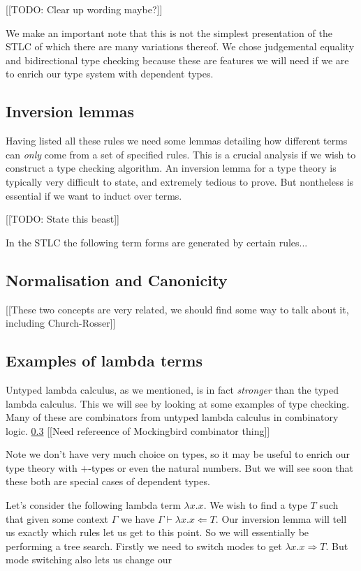 [[TODO: Clear up wording maybe?]]
\begin{remark}
    We make an important note that this is not the simplest presentation of the STLC of which there are many variations thereof. We chose judgemental equality and bidirectional type checking because these are features we will need if we are to enrich our type system with dependent types.
\end{remark}

\subsection{Inversion lemmas}
Having listed all these rules we need some lemmas detailing how different terms can \emph{only} come from a set of specified rules. This is a crucial analysis if we wish to construct a type checking algorithm. An inversion lemma for a type theory is typically very difficult to state, and extremely tedious to prove. But nontheless is essential if we want to induct over terms.

[[TODO: State this beast]]
\begin{lemma}
    In the STLC the following term forms are generated by certain rules...
\end{lemma}

\subsection{Normalisation and Canonicity}

[[These two concepts are very related, we should find some way to talk about it, including Church-Rosser]]

\subsection{Examples of lambda terms}

Untyped lambda calculus, as we mentioned, is in fact \emph{stronger} than the typed lambda calculus. This we will see by looking at some examples of type checking. Many of these are combinators from untyped lambda calculus in combinatory logic. \ref{} [[Need refereence of Mockingbird combinator thing]]

Note we don't have very much choice on types, so it may be useful to enrich our type theory with $+$-types or even the natural numbers. But we will see soon that these both are special cases of dependent types.

\begin{example}
    Let's consider the following lambda term $\lambda x . x$. We wish to find a type $T$ such that given some context $\Gamma$ we have $\Gamma \vdash \lambda x . x \Leftarrow T$. Our inversion lemma will tell us exactly which rules let us get to this point. So we will essentially be performing a tree search. Firstly we need to switch modes to get $\lambda x . x \Rightarrow T$. But mode switching also lets us change our 
    \begin{prooftree}
    \end{prooftree}
\end{example}

